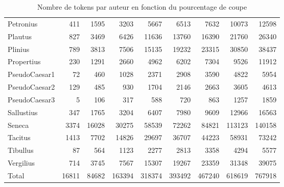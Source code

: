 \begin{table}[h]
\begin{tabular}{lrrrrrrrr}
 Petronius     &   411    &  1595    &   3203   &   5667   &   6513    &   7632   &  10073   &  12598   \\
 Plautus       &   827    &  3469    &   6426   &  11636   &  13760    &  16390   &  21760   &  26340   \\
 Plinius       &   789    &  3813    &   7506   &  15135   &  19232    &  23315   &  30850   &  38437   \\
 Propertius    &   230    &  1291    &   2660   &   4962   &   6202    &   7304   &   9526   &  11912   \\
 PseudoCaesar1 &    72    &   460    &   1028   &   2371   &   2908    &   3590   &   4822   &   5954   \\
 PseudoCaesar2 &   129    &   485    &    930   &   1704   &   2146    &   2663   &   3605   &   4613   \\
 PseudoCaesar3 &     5    &   106    &    317   &    588   &    720    &    863   &   1257   &   1859   \\
 Sallustius    &   347    &  1765    &   3204   &   6407   &   7980    &   9609   &  12966   &  16563   \\
 Seneca        &  3374    & 16028    &  30275   &  58539   &  72262    &  84821   & 113123   & 140158   \\
 Tacitus       &  1413    &  7702    &  14826   &  29697   &  36707    &  44223   &  58931   &  73242   \\
 Tibullus      &    87    &   564    &   1123   &   2277   &   2813    &   3358   &   4294   &   5577   \\
 Vergilius     &   714    &  3745    &   7567   &  15307   &  19267    &  23359   &  31348   &  39075   \\
 Total         & 16811    & 84682    & 163394   & 318374   & 393492    & 467240   & 618619   & 767918   \\
\hline
\end{tabular}
\caption{Nombre de tokens par auteur en fonction du pourcentage de coupe }
\label{table:lasla:extensibilite}
\end{table}


